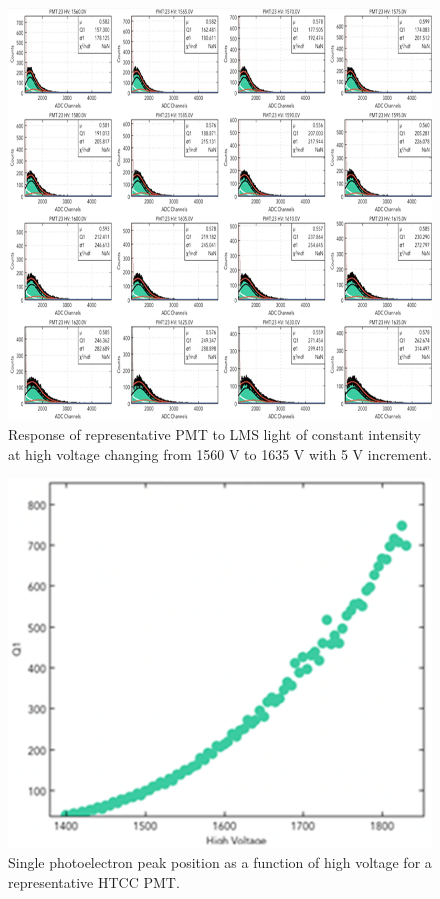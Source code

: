 \begin{figure}[ht]
\centering
\includegraphics[width=0.99\linewidth]{images/WILLIAM_2.png}
\caption{Response of representative PMT to LMS light of constant intensity at high voltage changing from 1560 V to 1635 V with 5 V increment.}
\label{fig:WILLIAM_2}
\end{figure}

\begin{figure}[ht]
\centering
\includegraphics[width=0.99\linewidth]{images/WILLIAM_3_NEW.png}
\caption{Single photoelectron peak position as a function of high voltage for a representative HTCC PMT.}
\label{fig:WILLIAM_3_NEW}
\end{figure}

